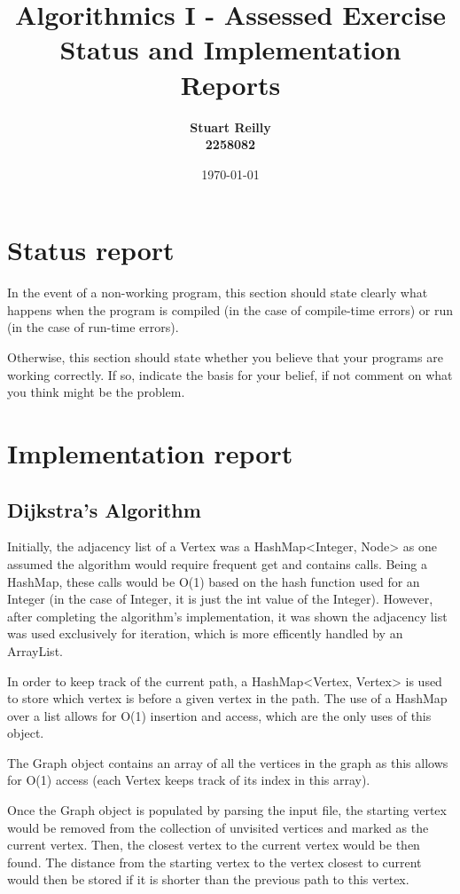 \documentclass{article}
\title{Algorithmics I - Assessed Exercise\\ \vspace{4mm} 
Status and Implementation Reports}
\author{\bf Stuart Reilly\\ \bf 2258082}
\date{\today}
\begin{document}
\maketitle

\section*{Status report}

In the event of a non-working program, this section should state clearly what happens when the program is compiled (in the case of compile-time errors) or run (in the case of run-time errors).  

Otherwise, this section should state whether you believe that your programs are working correctly. If so, indicate the basis for your belief, if not comment on what you think might be the problem.

\section*{Implementation report}

\subsection*{Dijkstra's Algorithm}

Initially, the adjacency list of a Vertex was a HashMap<Integer, Node> as one assumed the algorithm would require
frequent get and contains calls.
Being a HashMap, these calls would be O(1) based on the hash function used for an Integer (in the case of Integer, it is
just the int value of the Integer).
However, after completing the algorithm's implementation, it was shown the adjacency list was used exclusively for
iteration, which is more efficently handled by an ArrayList.

In order to keep track of the current path, a HashMap<Vertex, Vertex> is used to store which vertex is before a given
vertex in the path.
The use of a HashMap over a list allows for O(1) insertion and access, which are the only uses of this object.

The Graph object contains an array of all the vertices in the graph as this allows for O(1) access (each Vertex keeps
track of its index in this array).

Once the Graph object is populated by parsing the input file, the starting vertex would be removed from the collection
of unvisited vertices and marked as the current vertex.
Then, the closest vertex to the current vertex would be then found.
The distance from the starting vertex to the vertex closest to current would then be stored if it is shorter than the
previous path to this vertex.
\end{document}
